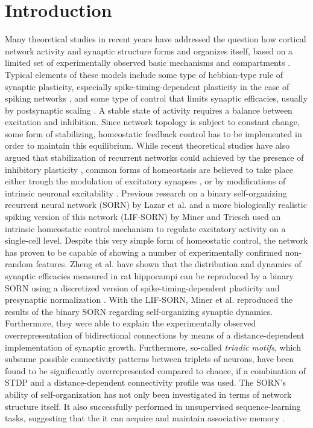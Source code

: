 \documentclass[10pt,letterpaper]{article}
\begin{document}
\linenumbers

\section*{Introduction}
Many theoretical studies in recent years have addressed the question how cortical network activity and synaptic structure forms and organizes itself, based on a limited set of experimentally observed basic mechanisms and compartments \cite{Lazar_2009,Savin_2010,Tetzlaff_2012,Effenberger_2015}. Typical elements of these models include some type of hebbian-type rule of synaptic plasticity, especially spike-timing-dependent plasticity in the case of spiking networks \cite{Zhang_STDP}, and some type of control that limits synaptic efficacies, usually by postsynaptic scaling \cite{Turrigiano_2008}. A stable state of activity requires a balance between excitation and inhibition. Since network topology is subject to constant change, some form of stabilizing, homeostatic feedback control has to be implemented in order to maintain this equilibrium. While recent theoretical studies have also argued that stabilization of recurrent networks could achieved by the presence of inhibitory plasticity \cite{Vogels_2011}, common forms of homeostasis are believed to take place either trough the modulation of excitatory synapses \cite{Syn_Plast_Abbott}, or by modifications of intrinsic neuronal excitability \cite{LeMasson_1993}. Previous research on a binary self-organizing recurrent neural network (SORN) by Lazar et al. \cite{Lazar_2009} and a more biologically realistic spiking version of this network (LIF-SORN) by Miner and Triesch \cite{SORN_Paper} used an intrinsic homeostatic control mechanism to regulate excitatory activity on a single-cell level. Despite this very simple form of homeostatic control, the network has proven to be capable of showing a number of experimentally confirmed non-random features. Zheng et al. have shown that the distribution and dynamics of synaptic efficacies measured in rat hippocampi can be reproduced by a binary SORN using a discretized version of spike-timing-dependent plasticity and presynaptic normalization \cite{Pengsheng_2013}. With the LIF-SORN, Miner et al. reproduced the results of the binary SORN regarding self-organizing synaptic dynamics. Furthermore, they were able to explain the experimentally observed overrepresentation of bidirectional connections \cite{Markram_Connections_1997,Song_Connectivity_2005} by means of a distance-dependent implementation of synaptic growth. Furthermore, so-called \textit{triadic motifs}, which subsume possible connectivity patterns between triplets of neurons, have been found to be significantly overrepresented compared to chance, if a combination of STDP and a distance-dependent connectivity profile was used. The SORN's ability of self-organization has not only been investigated in terms of network structure itself. It also successfully performed in unsupervised sequence-learning tasks, suggesting that the it can acquire and maintain associative memory \cite{Hartmann_2016}.
\end{document}
